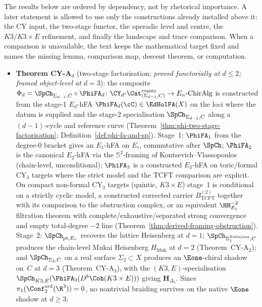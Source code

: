 The results below are ordered by dependency, not by rhetorical
importance. A later statement is allowed to use only the constructions
already installed above it: the CY input, the two-stage functor, the
operadic level and centre, the \(K3 / K3 \times E\) refinement, and finally the
landscape and trace comparison. When a comparison is unavailable, the
text keeps the mathematical target fixed and names the missing lemma,
comparison map, descent theorem, or computation.

\begin{itemize}[leftmargin=1.5em,topsep=0.3ex,itemsep=0.5ex]
 \item \textbf{Theorem CY-A$_d$} (two-stage factorisation;
 \emph{proved functorially at $d \leq 2$; framed
	 object-level at $d = 3$}): the composite
	 $\Phi_d = \SpCh_{\Sigma_{d-1}, C} \circ \PhiFA_d
	 \colon \CY_d\text{-}\Cat^{\mathrm{constr}}_{(\Sigma_{d-1},C)}
	 \to E_n\text{-}\mathrm{ChirAlg}$
	 is constructed from the stage-1 $E_d$-hFA
	 $\PhiFA_d(\cC) \in \EdHolFA(X)$ on the loci where the datum is
 supplied and the
 stage-2 specialisation $\SpCh_{\Sigma_{d-1}, C}$ along a
 $(d-1)$-cycle and reference curve
 (Theorem~\ref{thm:phi-two-stage-factorisation};
 Definition~\ref{def:phi-fa-and-sp}). Stage~1: $\PhiFA_1$
 from the degree-$0$ bracket gives an $E_1$-hFA on $E_\tau$,
 commutative after $\SpCh$;
 $\PhiFA_2$ is the canonical $E_2$-hFA via the
	 $\mathbb{S}^2$-framing of Kontsevich--Vlassopoulos (chain-level,
	 unconditional); $\PhiFA_3$ is a constructed $E_3$-hFA on toric/formal
 CY$_3$ targets where the strict model and the TCFT comparison are
 explicit. On compact non-formal CY$_3$ targets (quintic,
 $K3 \times E$) stage~1 is conditional on a strictly cyclic model,
 a constructed corrected carrier $B^{(2)}_{\mathrm{TCFT}}$ together
 with its comparison to the obstruction complex, or an equivalent
 $\HH^{-2}_{E_1}$ filtration theorem with complete/exhaustive/separated
 strong convergence and empty total-degree $-2$ line
 (Theorem~\ref{thm:derived-framing-obstruction}).
 Stage~2: $\SpCh_{\mathrm{pt}, E_\tau}$ recovers the lattice
 Heisenberg at $d = 1$; $\SpCh_{\Sigma_1^{\mathrm{Nakajima}},
 C}$ produces the chain-level Mukai Heisenberg
 $H_{\mathrm{Muk}}$ at $d = 2$ (Theorem~CY-A$_2$); and
 $\SpCh_{\Sigma_2, C}$ on a real surface $\Sigma_2 \subset X$
 produces an $\Eone$-chiral shadow on~$C$ at $d = 3$
 (Theorem~CY-A$_3$), with the $(K3, E)$-specialisation
 $\SpCh_{K3, E}(\PhiFA_3(D^b\Coh(K3 \times E)))$ giving
 $\mathbf{H}_{\Delta_5}$. Since
 $\pi_1(\Conf_2^{\mathrm{ord}}(\R^3)) = 0$, no nontrivial
 braiding survives on the native $\Eone$ shadow at $d \geq 3$;

\end{itemize}
